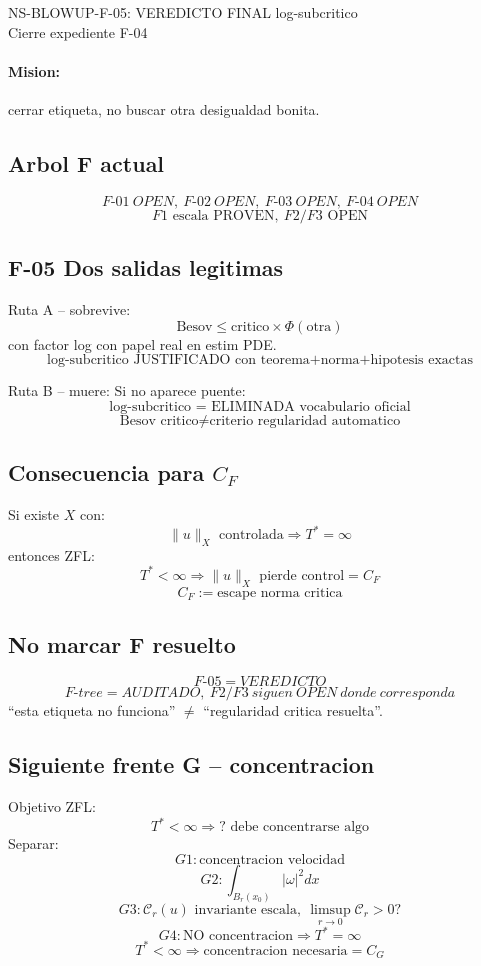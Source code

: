 \documentclass[11pt]{article}
\begin{document}
\begin{center}
{\Large NS-BLOWUP-F-05: VEREDICTO FINAL log-subcritico}\\
Cierre expediente F-04
\end{center}

\paragraph{Mision:} cerrar etiqueta, no buscar otra desigualdad bonita.

\subsection*{Arbol F actual}
\[
F\text{-}01\ OPEN,\ F\text{-}02\ OPEN,\ F\text{-}03\ OPEN,\ F\text{-}04\ OPEN
\]
\[
F1\text{ escala PROVEN},\ F2/F3\text{ OPEN}
\]

\subsection*{F-05 Dos salidas legitimas}

Ruta A -- sobrevive:
\[
\text{Besov}\le\text{critico}\times\Phi(\text{otra})
\]
con factor log con papel real en estim PDE.
\[
\boxed{\text{log-subcritico JUSTIFICADO con teorema+norma+hipotesis exactas}}
\]

Ruta B -- muere:
Si no aparece puente:
\[
\boxed{\text{log-subcritico = ELIMINADA vocabulario oficial}}
\]
\[
\boxed{\text{Besov critico}\neq\text{criterio regularidad automatico}}
\]

\subsection*{Consecuencia para $C_F$}
Si existe $X$ con:
\[
\|u\|_X\text{ controlada}\Rightarrow T^*=\infty
\]
entonces ZFL:
\[
\boxed{T^*<\infty\Rightarrow\|u\|_X\text{ pierde control}=C_F}
\]
\[
C_F:=\text{escape norma critica}
\]

\subsection*{No marcar F resuelto}
\[
\boxed{F\text{-}05=VEREDICTO}
\]
\[
\boxed{F\text{-}tree=AUDITADO,\ F2/F3\ siguen\ OPEN\ donde\ corresponda}
\]
``esta etiqueta no funciona'' $\neq$ ``regularidad critica resuelta''.

\subsection*{Siguiente frente G -- concentracion}
Objetivo ZFL:
\[
T^*<\infty\Rightarrow\text{? debe concentrarse algo}
\]
Separar:
\[
G1:\text{concentracion velocidad}
\]
\[
G2:\int_{B_r(x_0)}|\omega|^2 dx
\]
\[
G3:\mathcal C_r(u)\text{ invariante escala},\ \limsup_{r\to0}\mathcal C_r>0?
\]
\[
\boxed{G4: \text{NO concentracion}\Rightarrow T^*=\infty}
\]
\[
\boxed{T^*<\infty\Rightarrow\text{concentracion necesaria}=C_G}
\]
\end{document}
